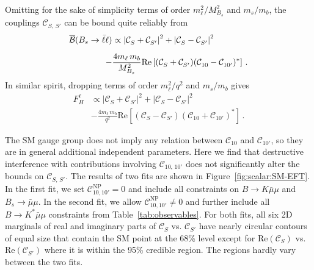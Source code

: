 \documentclass[twocolumn,epjc3]{svjour3}
\numberwithin{equation}{section}
\def \reffig#1{Figure~\ref{#1}}
\def \reftab#1{Table~\ref{#1}}
\newcommand{\wilson}[2][{}]{\mathcal{C}_{#2}^{\mathrm{#1}}}
\renewcommand{\[}{\big[}
\renewcommand{\]}{\big]}
\renewcommand{\(}{\big(}
\renewcommand{\)}{\big)}
\begin{document}
Omitting for the sake of simplicity terms of order $m_\ell^2/M_{B_s}^2$ and
$m_s/m_b$, the couplings $\wilson{S,\, S'}$ can be bound quite reliably from
\cite{Alonso:2014csa}
\begin{equation}
\begin{aligned}
  \overline{\cal B}(B_s\to \bar\ell\ell) & \propto
      \left|\wilson{S} + \wilson{S'}\right|^2
    + \left|\wilson{S} - \wilson{S'}\right|^2
\\[0.2cm]
  - & \frac{4 m_\ell\, m_b}{M_{B_s}^2} \mbox{Re}
  \left[ (\wilson{S} + \wilson{S'})(\wilson{10} - \wilson{10'})^* \right] \,.
\end{aligned}
\end{equation}
In similar spirit, dropping terms of order $m_\ell^2/q^2$ and
$m_s/m_b$ gives
\begin{equation}
\begin{aligned}
  F_H^\ell & \propto
      \left|\wilson{S} + \wilson{S'}\right|^2
    + \left|\wilson{S} - \wilson{S'}\right|^2
\\[0.2cm]
  & - \frac{4 m_\ell\, m_b}{q^2} \mbox{Re}
  \left[ (\wilson{S} - \wilson{S'})(\wilson{10} + \wilson{10'})^* \right] \,.
\end{aligned}
\end{equation}

The SM gauge group does not imply any relation between $\wilson{10}$ and
$\wilson{10'}$, so they are in general additional independent parameters. Here
we find that destructive interference with contributions involving
$\wilson{10,\, 10'}$ does not significantly alter the bounds on $\wilson{S,\,
  S'}$.  The results of two fits are shown in \reffig{fig:scalar:SM-EFT}. In the
first fit, we set $\wilson[NP]{10, 10'} = 0$ and include all constraints on
{$B \to K \bar\mu\mu$ and $B_s \to \bar\mu\mu$}. In the second fit, we allow
$\wilson[NP]{10, 10'} \ne 0$ and further include all {$B \to K^* \bar\mu\mu$}
constraints from \reftab{tab:observables}. For both fits, all six 2D marginals
of real and imaginary parts of $\wilson{S}$ vs. $\wilson{S'}$ have nearly
circular contours of equal size that contain the SM point at the 68\% level
except for $\mbox{Re}(\wilson{S})$ vs. $\mbox{Re}(\wilson{S'})$ where it is
within the 95\% credible region. The regions hardly vary between the two fits.
\end{document}
